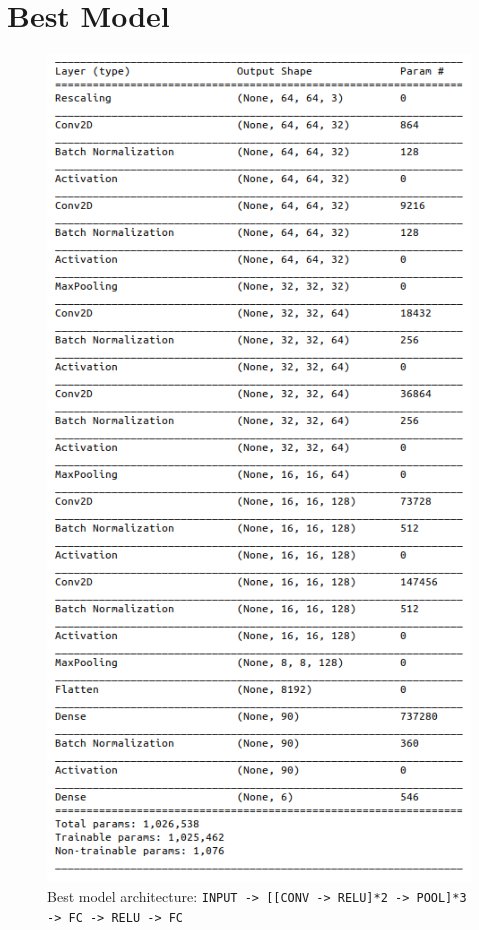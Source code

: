 \documentclass{article}
\begin{document}
\section{Best Model}
\begin{figure}[h]
    \centering
    \includegraphics[height=0.7\textheight]{best_model_arch}
    \caption{Best model architecture: \texttt{INPUT -> [[CONV -> RELU]*2 -> POOL]*3 -> FC -> RELU -> FC}}
    \label{fig:best_model_arch}
\end{figure}
\end{document}
